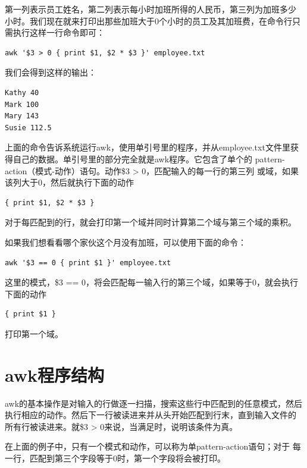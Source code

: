 第一列表示员工姓名，第二列表示每小时加班所得的人民币，第三列为加班多少
小时。我们现在就来打印出那些加班大于0个小时的员工及其加班费，在命令行只
需执行这样一行命令即可：

\small{
\begin{verbatim}
awk '$3 > 0 { print $1, $2 * $3 }' employee.txt
\end{verbatim}
}
\normalsize

我们会得到这样的输出：

\small{
\begin{verbatim}
Kathy 40
Mark 100
Mary 143
Susie 112.5
\end{verbatim}
}
\normalsize

上面的命令告诉系统运行awk，使用单引号里的程序，并从employee.txt文件里获
得自己的数据。单引号里的部分完全就是awk程序。它包含了单个的
pattern-action（模式-动作）语句。动作\$3 >  0，匹配输入的每一行的第三列
或域，如果该列大于0，然后就执行下面的动作

\small{
\begin{verbatim}
{ print $1, $2 * $3 }
\end{verbatim}
}
\normalsize

对于每匹配到的行，就会打印第一个域并同时计算第二个域与第三个域的乘积。

如果我们想看看哪个家伙这个月没有加班，可以使用下面的命令：

\small{
\begin{verbatim}
awk '$3 == 0 { print $1 }' employee.txt
\end{verbatim}
}
\normalsize

这里的模式，\$3 == 0，将会匹配每一输入行的第三个域，如果等于0，就会执行下面的动作

\small{
\begin{verbatim}
{ print $1 }
\end{verbatim}
}
\normalsize

打印第一个域。

\section{awk程序结构}

awk的基本操作是对输入的行做逐一扫描，搜索这些行中匹配到的任意模式，然后
执行相应的动作。然后下一行被读进来并从头开始匹配到行末，直到输入文件的
所有行被读进来。就\$3 > 0来说，当满足时，说明该条件为真。

在上面的例子中，只有一个模式和动作，可以称为单pattern-action语句；对于
每一行，匹配到第三个字段等于0时，第一个字段将会被打印。

